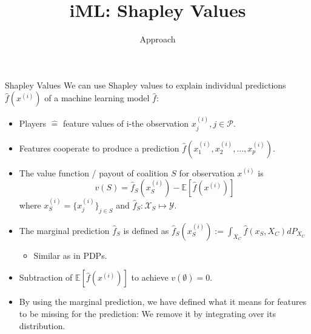 \documentclass[aspectratio=169]{../latex_main/tntbeamer}  %
\title[Introduction]{iML: Shapley Values}
\subtitle{Approach}
\begin{document}
	
	\maketitle
	

\begin{frame}{Shapley Values}
  We can use Shapley values to explain individual predictions $\hat{f}(x^{(i)})$ of a machine learning model $\hat{f}$:
\begin{itemize}
  \item Players $\hat{=}$ feature values of i-the observation $x_j^{(i)}, j \in \mathcal{P}$.
  \item Features cooperate to produce a prediction $\hat{f}(x^{(i)}_1, x^{(i)}_2, \ldots, x^{(i)}_p)$.
  \pause
  \item The value function / payout of coalition $S$ for observation $x^{(i)}$ is
    $$v(S) =  \hat{f}_{S} (x^{(i)}_S) - \mathbb{E}[\hat{f}(x^{(i)})]$$ 
    where $x^{(i)}_S = \{x_j^{(i)}\}_{j \in S}$ and $\hat{f}_S: \mathcal{X}_S \mapsto \mathcal{Y}$.
  \item The marginal prediction $\hat{f}_S$ is defined as $\hat{f}_{S}(x_S^{(i)}) := \int_{X_C} \hat{f}(x_S, X_C)d P_{X_C}$
\begin{itemize}
    \item Similar as in PDPs.
\end{itemize}

\item Subtraction of $\mathbb{E}[\hat{f}(x^{(i)})]$ to achieve $v(\emptyset) = 0$.
\item By using the marginal prediction, we have defined what it means for features to be \alert{missing} for the prediction: We remove it by integrating over its distribution.
\end{itemize}

\end{frame}
\end{document}

